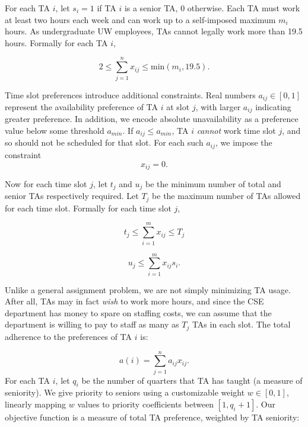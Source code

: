 \documentclass{article}
\begin{document}
\begin{multicols}{2}
For each TA $i$, let $s_i = 1$ if TA $i$ is a senior TA, 0 otherwise. Each TA must work at least two hours each week and can work up to a self-imposed maximum $m_i$ hours. As undergraduate UW employees, TAs cannot legally work more than 19.5 hours. Formally for each TA $i$,

\begin{equation}
2 \leq \sum_{j=1}^{n}x_{ij} \leq \textrm{min}(m_i, 19.5).
\end{equation}

Time slot preferences introduce additional constraints. Real numbers $a_{ij} \in [0,1]$ represent the availability preference of TA $i$ at slot $j$, with larger $a_{ij}$ indicating greater preference. In addition, we encode absolute unavailability as a preference value below some threshold $a_{min}$. If $a_{ij} \leq a_{min}$, TA $i$ \textit{cannot} work time slot $j$, and so should not be scheduled for that slot. For each such $a_{ij}$, we impose the constraint
\begin{equation}
x_{ij} = 0.
\end{equation}

Now for each time slot $j$, let $t_j$ and $u_j$ be the minimum number of total and senior TAs respectively required. Let $T_j$ be the maximum number of TAs allowed for each time slot. Formally for each time slot $j$,

\begin{equation}
t_j \leq \sum_{i=1}^{m}x_{ij} \leq T_j
\end{equation}

\begin{equation}
u_j \leq \sum_{i=1}^{m}x_{ij}s_i.
\end{equation}

Unlike a general assignment problem, we are not simply minimizing TA usage. After all, TAs may in fact \textit{wish} to work more hours, and since the CSE department has money to spare on staffing costs, we can assume that the department is willing to pay to staff as many as $T_j$ TAs in each slot. The total adherence to the preferences of TA $i$ is:

\begin{equation}
a(i) = \sum_{j=1}^na_{ij}x_{ij}.
\end{equation}
For each TA $i$, let $q_i$ be the number of quarters that TA has taught (a measure of seniority). We give priority to seniors using a customizable weight $w \in [0,1]$, linearly mapping $w$ values to priority coefficients between $[1, q_i + 1]$. Our objective function is a measure of total TA preference, weighted by TA seniority:


\end{multicols}
\end{document}
